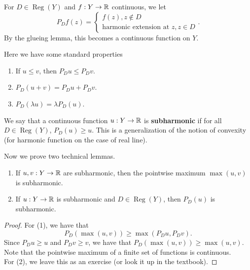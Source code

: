 \documentclass{article}
\begin{document}
{\begin{definition}
For $D \in \operatorname{Reg}(Y)$ and $f: Y \to \mathbb{R}$ continuous, we let 
\[P_D f(z) = \begin{cases}
    f(z), z \notin D\\
    \text{harmonic extension at $z$}, z \in D
\end{cases}.\]
By the glueing lemma, this becomes a continuous function on $Y$.
\end{definition}

\begin{lemma}
    Here we have some standard properties
    \begin{enumerate}
        \item If $u \leq v$, then $P_D u \leq P_D v$.
        \item $P_D(u + v) = P_D u + P_D v$.
        \item $P_D (\lambda u) = \lambda P_D(u)$.
    \end{enumerate}
\end{lemma}

\begin{definition}
    We say that a continuous function $u: Y \to \mathbb{R}$ is \textbf{subharmonic} if for all $D \in \operatorname{Reg}(Y)$, $P_D(u) \geq u$. This is a generalization of the notion of convexity (for harmonic function on the case of real line).
\end{definition}

Now we prove two technical lemmas.
\begin{lemma}
    \begin{enumerate}
        \item If $u, v: Y \to \mathbb{R}$ are subharmonic, then the pointwise maximum $\operatorname{max}(u, v)$ is subharmonic.
        \item If $u: Y \to \mathbb{R}$ is subharmonic and $D \in \operatorname{Reg}(Y)$, then $P_D(u)$ is subharmonic.
    \end{enumerate}
\end{lemma}

\begin{proof}
    For (1), we have that 
    \[P_D( \max(u, v)) \geq \max(P_D u, P_D v).\]
    Since $P_D u \geq u$ and $P_D v \geq v$, we have that $P_D(\max(u, v)) \geq \max(u, v)$. Note that the pointwise maximum of a finite set of functions is continuous.\\

    For (2), we leave this as an exercise (or look it up in the textbook).
\end{proof}

}
\end{document}
